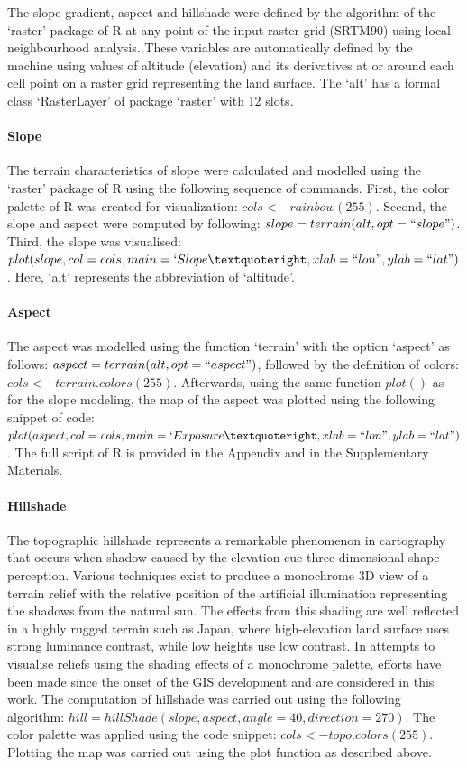 \documentclass[land,article,accept,pdftex,moreauthors]{Definitions/mdpi}
\begin{document}
The slope gradient, aspect and hillshade were defined by the algorithm of the ‘raster’ package of R at any point of the input raster grid (SRTM90) using local neighbourhood analysis. These variables are automatically defined by the machine using values of altitude (elevation) and its derivatives at or around each cell point on a raster grid representing the land surface. The ‘alt’ has a formal class `RasterLayer' of package ‘raster’ with 12 slots.

\paragraph{Slope}
The terrain characteristics of slope were calculated and modelled using the ‘raster’ package of R using the following sequence of commands. First, the color palette of R was created for visualization: $cols <- rainbow(255)$. Second, the slope and aspect were computed by following: $slope = terrain(alt, opt = ``slope")$. Third, the slope was visualised: $plot(slope, col=cols, main= `Slope’, xlab = ``lon", ylab = ``lat")$. Here, ‘alt’ represents the abbreviation of ‘altitude’.

\paragraph{Aspect}
The aspect was modelled using the function ‘terrain’ with the option ‘aspect’ as follows: $aspect = terrain(alt, opt = ``aspect")$, followed by the definition of colors: $cols <- terrain.colors(255)$. Afterwards, using the same function $plot()$ as for the slope modeling, the map of the aspect was plotted using the following snippet of code: $plot(aspect, col=cols, main = `Exposure’, xlab = ``lon", ylab = ``lat")$. The full script of R is provided in the Appendix and in the Supplementary Materials.
 
 \paragraph{Hillshade} 
The topographic hillshade represents a remarkable phenomenon in cartography that occurs when shadow caused by the elevation cue three-dimensional shape perception. Various techniques exist to produce a monochrome 3D view of a terrain relief with the relative position of the artificial illumination representing the shadows from the natural sun. The effects from this shading are well reflected in a highly rugged terrain such as Japan, where high-elevation land surface uses strong luminance contrast, while low heights use low contrast. In attempts to visualise reliefs using the shading effects of a monochrome palette, efforts have been made since the onset of the GIS development and are considered in this work. The computation of hillshade was carried out using the following algorithm: $hill = hillShade(slope, aspect, angle = 40, direction = 270)$. The color palette was applied using the code snippet: $cols <- topo.colors(255)$. Plotting the map was carried out using the plot function as described above.
 
\end{document}
